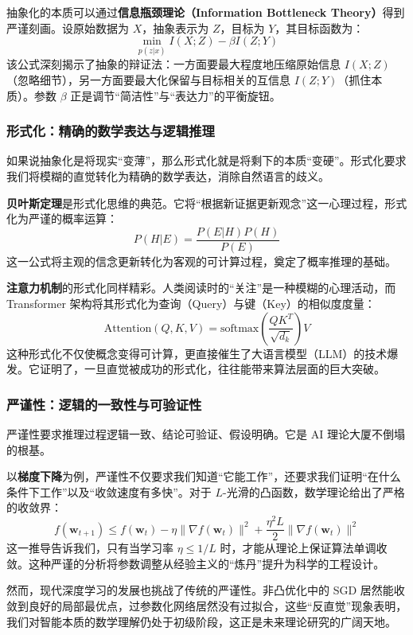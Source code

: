 抽象化的本质可以通过\textbf{信息瓶颈理论（Information Bottleneck Theory）}得到严谨刻画。设原始数据为 $X$，抽象表示为 $Z$，目标为 $Y$，其目标函数为：
$$\min_{p(z|x)} I(X;Z) - \beta I(Z;Y)$$
该公式深刻揭示了抽象的辩证法：一方面要最大程度地压缩原始信息 $I(X;Z)$（忽略细节），另一方面要最大化保留与目标相关的互信息 $I(Z;Y)$（抓住本质）。参数 $\beta$ 正是调节“简洁性”与“表达力”的平衡旋钮。

\subsubsection{形式化：精确的数学表达与逻辑推理}

如果说抽象化是将现实“变薄”，那么形式化就是将剩下的本质“变硬”。形式化要求我们将模糊的直觉转化为精确的数学表达，消除自然语言的歧义。

\textbf{贝叶斯定理}是形式化思维的典范。它将“根据新证据更新观念”这一心理过程，形式化为严谨的概率运算：
$$P(H|E) = \frac{P(E|H)P(H)}{P(E)}$$
这一公式将主观的信念更新转化为客观的可计算过程，奠定了概率推理的基础。

\textbf{注意力机制}的形式化同样精彩。人类阅读时的“关注”是一种模糊的心理活动，而 Transformer 架构将其形式化为查询（Query）与键（Key）的相似度度量：
$$\text{Attention}(Q,K,V) = \text{softmax}\left(\frac{QK^T}{\sqrt{d_k}}\right)V$$
这种形式化不仅使概念变得可计算，更直接催生了大语言模型（LLM）的技术爆发。它证明了，一旦直觉被成功的形式化，往往能带来算法层面的巨大突破。

\subsubsection{严谨性：逻辑的一致性与可验证性}

严谨性要求推理过程逻辑一致、结论可验证、假设明确。它是 AI 理论大厦不倒塌的根基。

以\textbf{梯度下降}为例，严谨性不仅要求我们知道“它能工作”，还要求我们证明“在什么条件下工作”以及“收敛速度有多快”。对于 $L$-光滑的凸函数，数学理论给出了严格的收敛界：
$$f(\mathbf{w}_{t+1}) \leq f(\mathbf{w}_t) - \eta \|\nabla f(\mathbf{w}_t)\|^2 + \frac{\eta^2 L}{2} \|\nabla f(\mathbf{w}_t)\|^2$$
这一推导告诉我们，只有当学习率 $\eta \leq 1/L$ 时，才能从理论上保证算法单调收敛。这种严谨的分析将参数调整从经验主义的“炼丹”提升为科学的工程设计。

然而，现代深度学习的发展也挑战了传统的严谨性。非凸优化中的 SGD 居然能收敛到良好的局部最优点，过参数化网络居然没有过拟合，这些“反直觉”现象表明，我们对智能本质的数学理解仍处于初级阶段，这正是未来理论研究的广阔天地。
